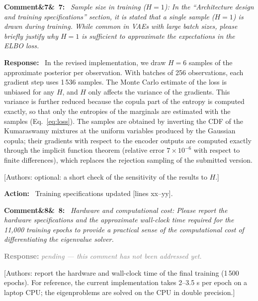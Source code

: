 \documentclass[11pt]{article}
\newenvironment{rcomment}[1]{\par\bigskip\noindent\textbf{Comment\ifx&#1&\else\ #1\fi:}\ \itshape}{\par}
\newenvironment{response}{\par\smallskip\noindent\color{resp}\textbf{Response:}\ }{\par}
\newenvironment{action}{\par\smallskip\noindent\color{resp}\textbf{Action:}\ }{\par}
\newcommand{\pending}{\par\smallskip\noindent\textcolor{gray}{\textbf{Response:} \textit{pending --- this comment
has not been addressed yet.}}\par}
\newcommand{\authornote}[1]{\textcolor{note}{\textsf{[Authors: #1]}}}
\newcommand{\tbd}[1]{\textcolor{note}{\textsf{[#1]}}}
\newcommand{\lines}[1]{\tbd{lines #1}}
\begin{document}
\begin{rcomment}{7}
Sample size in training ($H=1$): In the ``Architecture design and training specifications'' section, it is stated that
a single sample ($H=1$) is drawn during training. While common in VAEs with large batch sizes, please briefly justify why
$H=1$ is sufficient to approximate the expectations in the ELBO loss.
\end{rcomment}

\begin{response}
In the revised implementation, we draw $H=6$ samples of the approximate posterior per observation. With batches of 256
observations, each gradient step uses 1\,536 samples. The Monte Carlo estimate of the loss is unbiased for any $H$, and
$H$ only affects the variance of the gradients. This variance is further reduced because the copula part of the entropy
is computed exactly, so that only the entropies of the marginals are estimated with the samples (Eq.~\eqref{eq:loss}).
The samples are obtained by inverting the CDF of the Kumaraswamy mixtures at the uniform variables produced by the
Gaussian copula; their gradients with respect to the encoder outputs are computed exactly through the implicit function
theorem (relative error $7\times10^{-6}$ with respect to finite differences), which replaces the rejection sampling of
the submitted version.
\end{response}
\authornote{optional: a short check of the sensitivity of the results to $H$.}

\begin{action}
Training specifications updated \lines{xx--yy}.
\end{action}

\begin{rcomment}{8}
Hardware and computational cost: Please report the hardware specifications and the approximate wall-clock time
required for the 11,000 training epochs to provide a practical sense of the computational cost of differentiating the
eigenvalue solver.
\end{rcomment}
\pending
\authornote{report the hardware and wall-clock time of the final training (1\,500 epochs). For reference, the current
implementation takes 2--3.5 s per epoch on a laptop CPU; the eigenproblems are solved on the CPU in double precision.}
\end{document}
